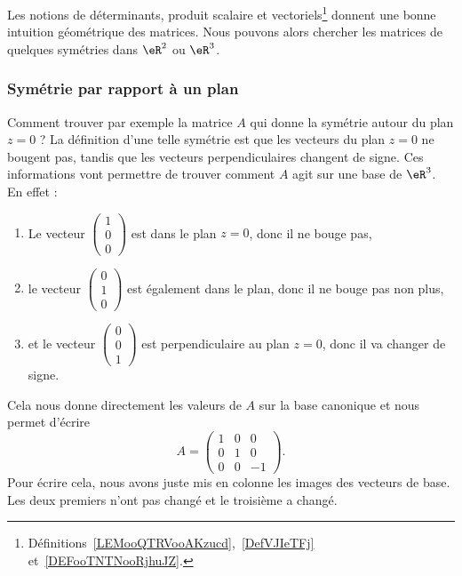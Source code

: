 Les notions de déterminants, produit scalaire et vectoriels\footnote{Définitions~\ref{LEMooQTRVooAKzucd},~\ref{DefVJIeTFj} et~\ref{DEFooTNTNooRjhuJZ}.} donnent une bonne intuition géométrique des matrices. Nous pouvons alors chercher les matrices de quelques symétries dans \( \eR^2\) ou \( \eR^3\).

\subsubsection{Symétrie par rapport à un plan}

Comment trouver par exemple la matrice \( A\) qui donne la symétrie autour du plan \( z=0\) ? La définition d'une telle symétrie est que les vecteurs du plan \( z=0\) ne bougent pas, tandis que les vecteurs perpendiculaires changent de signe. Ces informations vont permettre de trouver comment \( A\) agit sur une base de \( \eR^3\). En effet :
\begin{enumerate}

	\item
	      Le vecteur \( \begin{pmatrix}
		      1 \\
		      0 \\
		      0
	      \end{pmatrix}\) est dans le plan \( z=0\), donc il ne bouge pas,

	\item
	      le vecteur \( \begin{pmatrix}
		      0 \\
		      1 \\
		      0
	      \end{pmatrix}\) est également dans le plan, donc il ne bouge pas non plus,

	\item
	      et le vecteur \( \begin{pmatrix}
		      0 \\
		      0 \\
		      1
	      \end{pmatrix}\) est perpendiculaire au plan \( z=0\), donc il va changer de signe.

\end{enumerate}
Cela nous donne directement les valeurs de \( A\) sur la base canonique et nous permet d'écrire
\begin{equation}
	A=\begin{pmatrix}
		1 & 0 & 0  \\
		0 & 1 & 0  \\
		0 & 0 & -1
	\end{pmatrix}.
\end{equation}
Pour écrire cela, nous avons juste mis en colonne les images des vecteurs de base. Les deux premiers n'ont pas changé et le troisième a changé.


